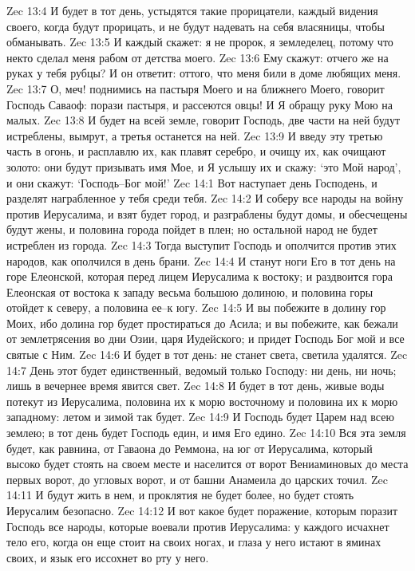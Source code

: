 Zec 13:4  И будет в тот день, устыдятся такие прорицатели, каждый видения своего, когда будут прорицать, и не будут надевать на себя власяницы, чтобы обманывать.
Zec 13:5  И каждый скажет: я не пророк, я земледелец, потому что некто сделал меня рабом от детства моего.
Zec 13:6  Ему скажут: отчего же на руках у тебя рубцы? И он ответит: оттого, что меня били в доме любящих меня.
Zec 13:7  О, меч! поднимись на пастыря Моего и на ближнего Моего, говорит Господь Саваоф: порази пастыря, и рассеются овцы! И Я обращу руку Мою на малых.
Zec 13:8  И будет на всей земле, говорит Господь, две части на ней будут истреблены, вымрут, а третья останется на ней.
Zec 13:9  И введу эту третью часть в огонь, и расплавлю их, как плавят серебро, и очищу их, как очищают золото: они будут призывать имя Мое, и Я услышу их и скажу: `это Мой народ', и они скажут: `Господь--Бог мой!'
Zec 14:1  Вот наступает день Господень, и разделят награбленное у тебя среди тебя.
Zec 14:2  И соберу все народы на войну против Иерусалима, и взят будет город, и разграблены будут домы, и обесчещены будут жены, и половина города пойдет в плен; но остальной народ не будет истреблен из города.
Zec 14:3  Тогда выступит Господь и ополчится против этих народов, как ополчился в день брани.
Zec 14:4  И станут ноги Его в тот день на горе Елеонской, которая перед лицем Иерусалима к востоку; и раздвоится гора Елеонская от востока к западу весьма большою долиною, и половина горы отойдет к северу, а половина ее--к югу.
Zec 14:5  И вы побежите в долину гор Моих, ибо долина гор будет простираться до Асила; и вы побежите, как бежали от землетрясения во дни Озии, царя Иудейского; и придет Господь Бог мой и все святые с Ним.
Zec 14:6  И будет в тот день: не станет света, светила удалятся.
Zec 14:7  День этот будет единственный, ведомый только Господу: ни день, ни ночь; лишь в вечернее время явится свет.
Zec 14:8  И будет в тот день, живые воды потекут из Иерусалима, половина их к морю восточному и половина их к морю западному: летом и зимой так будет.
Zec 14:9  И Господь будет Царем над всею землею; в тот день будет Господь един, и имя Его едино.
Zec 14:10  Вся эта земля будет, как равнина, от Гаваона до Реммона, на юг от Иерусалима, который высоко будет стоять на своем месте и населится от ворот Вениаминовых до места первых ворот, до угловых ворот, и от башни Анамеила до царских точил.
Zec 14:11  И будут жить в нем, и проклятия не будет более, но будет стоять Иерусалим безопасно.
Zec 14:12  И вот какое будет поражение, которым поразит Господь все народы, которые воевали против Иерусалима: у каждого исчахнет тело его, когда он еще стоит на своих ногах, и глаза у него истают в яминах своих, и язык его иссохнет во рту у него.
